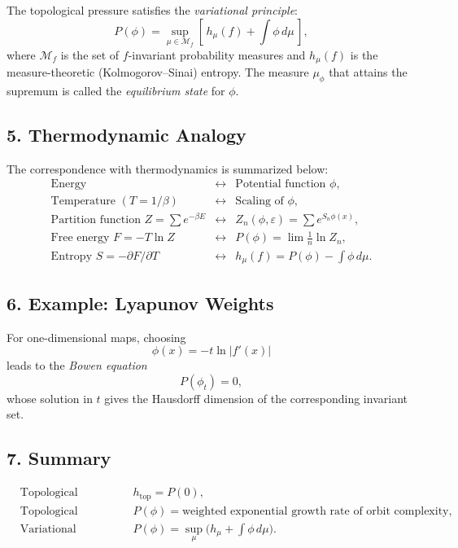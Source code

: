 \documentclass{article}
\begin{document}
The topological pressure satisfies the \emph{variational principle}:
\[
P(\phi) = \sup_{\mu \in \mathcal{M}_f} 
\left[\, h_\mu(f) + \int \phi \, d\mu \, \right],
\]
where \( \mathcal{M}_f \) is the set of \( f \)-invariant probability measures 
and \( h_\mu(f) \) is the measure-theoretic (Kolmogorov–Sinai) entropy.
The measure \( \mu_\phi \) that attains the supremum is called the \emph{equilibrium state} for \( \phi \).

\subsection*{5. Thermodynamic Analogy}

The correspondence with thermodynamics is summarized below:
\[
\begin{array}{lll}
\text{Energy} & \leftrightarrow & \text{Potential function } \phi, \\[4pt]
\text{Temperature } (T=1/\beta) & \leftrightarrow & \text{Scaling of } \phi, \\[4pt]
\text{Partition function } Z = \sum e^{-\beta E} & \leftrightarrow & Z_n(\phi,\varepsilon) = \sum e^{S_n \phi(x)}, \\[4pt]
\text{Free energy } F = -T \ln Z & \leftrightarrow & P(\phi) = \lim \frac{1}{n}\ln Z_n, \\[4pt]
\text{Entropy } S = -\partial F / \partial T & \leftrightarrow & h_\mu(f) = P(\phi) - \int \phi\, d\mu.
\end{array}
\]

\subsection*{6. Example: Lyapunov Weights}

For one-dimensional maps, choosing
\[
\phi(x) = -t \ln |f'(x)|
\]
leads to the \emph{Bowen equation}
\[
P(\phi_t) = 0,
\]
whose solution in \( t \) gives the Hausdorff dimension of the corresponding invariant set.

\subsection*{7. Summary}

\[
\boxed{
\begin{aligned}
&\text{Topological entropy:} && h_{\text{top}} = P(0), \\[4pt]
&\text{Topological pressure:} && P(\phi) = \text{weighted exponential growth rate of orbit complexity}, \\[4pt]
&\text{Variational principle:} && P(\phi) = \sup_{\mu} \big( h_\mu + \int \phi\, d\mu \big).
\end{aligned}
}
\]
\end{document}
